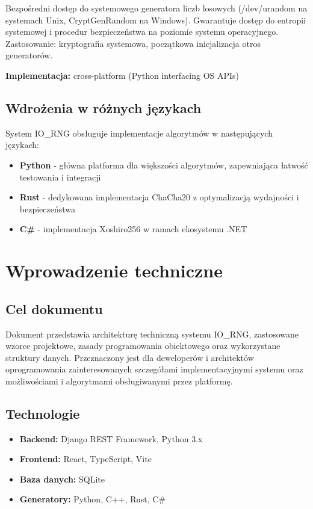 \documentclass[12pt,a4paper]{article}
\begin{document}
Bezpośredni dostęp do systemowego generatora liczb losowych (/dev/urandom na systemach Unix, CryptGenRandom na Windows). Gwarantuje dostęp do entropii systemowej i procedur bezpieczeństwa na poziomie systemu operacyjnego. Zastosowanie: kryptografia systemowa, początkowa inicjalizacja otros generatorów.

\textbf{Implementacja:} cross-platform (Python interfacing OS APIs)

\subsection{Wdrożenia w różnych językach}

System IO\_RNG obsługuje implementacje algorytmów w następujących językach:

\begin{itemize}
    \item \textbf{Python} - główna platforma dla większości algorytmów, zapewniająca łatwość testowania i integracji
    \item \textbf{Rust} - dedykowana implementacja ChaCha20 z optymalizacją wydajności i bezpieczeństwa
    \item \textbf{C\#} - implementacja Xoshiro256 w ramach ekosystemu .NET
\end{itemize}

\section{Wprowadzenie techniczne}

\subsection{Cel dokumentu}
Dokument przedstawia architekturę techniczną systemu IO\_RNG, zastosowane wzorce projektowe, zasady programowania obiektowego oraz wykorzystane struktury danych. Przeznaczony jest dla deweloperów i architektów oprogramowania zainteresowanych szczegółami implementacyjnymi systemu oraz możliwościami i algorytmami obsługiwanymi przez platformę.

\subsection{Technologie}
\begin{itemize}
    \item \textbf{Backend:} Django REST Framework, Python 3.x
    \item \textbf{Frontend:} React, TypeScript, Vite
    \item \textbf{Baza danych:} SQLite
    \item \textbf{Generatory:} Python, C++, Rust, C\#
\end{itemize}
\end{document}
